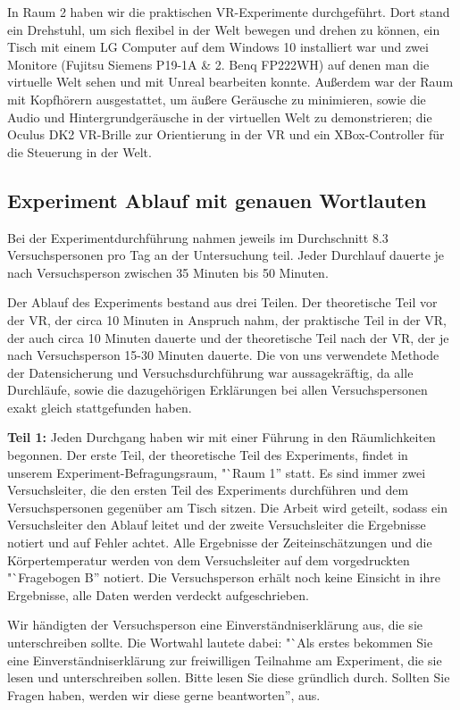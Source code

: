 \documentclass{Bericht}
\begin{document}
In Raum 2 haben wir die praktischen VR-Experimente durchgeführt. Dort stand ein Drehstuhl, um sich flexibel in der Welt bewegen und drehen zu können, ein Tisch mit einem LG Computer auf dem  Windows 10 installiert war und zwei Monitore (Fujitsu Siemens P19-1A \& 2. Benq FP222WH) auf denen man die virtuelle Welt sehen und mit Unreal bearbeiten konnte. Außerdem war der Raum mit Kopfhörern ausgestattet, um äußere Geräusche zu minimieren, sowie die Audio und Hintergrundgeräusche in der virtuellen Welt zu demonstrieren; die Oculus DK2 VR-Brille zur Orientierung in der VR und ein XBox-Controller für die Steuerung in der Welt.

\subsection {Experiment Ablauf mit genauen Wortlauten}
Bei der Experimentdurchführung nahmen jeweils im Durchschnitt 8.3 Versuchspersonen pro Tag an der Untersuchung teil. Jeder Durchlauf dauerte je nach Versuchsperson zwischen 35 Minuten bis 50 Minuten.

Der Ablauf des Experiments bestand aus drei Teilen. Der theoretische Teil vor der VR, der circa 10 Minuten in Anspruch nahm, der praktische Teil in der VR, der auch circa 10 Minuten dauerte und der theoretische Teil nach der VR, der je nach Versuchsperson 15-30 Minuten dauerte. Die von uns verwendete Methode der Datensicherung und Versuchsdurchführung war aussagekräftig, da alle Durchläufe, sowie die dazugehörigen Erklärungen bei allen Versuchspersonen exakt gleich stattgefunden haben.

\textbf{Teil 1:}
Jeden Durchgang haben wir mit einer Führung in den Räumlichkeiten begonnen. Der erste Teil, der theoretische Teil des Experiments, findet in unserem Experiment-Befragungsraum, "`Raum 1'' statt. Es sind immer zwei Versuchsleiter, die den ersten Teil des Experiments durchführen und dem Versuchspersonen gegenüber am Tisch sitzen. Die Arbeit wird geteilt, sodass ein Versuchsleiter den Ablauf leitet und der zweite Versuchsleiter die Ergebnisse notiert und auf Fehler achtet. Alle Ergebnisse der Zeiteinschätzungen und die Körpertemperatur werden von dem Versuchsleiter auf dem vorgedruckten "`Fragebogen B'' notiert. Die Versuchsperson erhält noch keine Einsicht in ihre Ergebnisse, alle Daten werden verdeckt aufgeschrieben.

Wir händigten der Versuchsperson eine Einverständniserklärung aus, die sie unterschreiben sollte. Die Wortwahl lautete dabei: 
"`Als erstes bekommen Sie eine Einverständniserklärung zur freiwilligen Teilnahme am Experiment, die sie lesen und unterschreiben sollen. Bitte lesen Sie diese gründlich durch. Sollten Sie Fragen haben, werden wir diese gerne beantworten'', aus.
\end{document}
